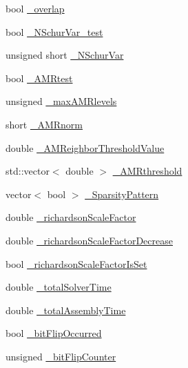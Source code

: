 \begin{DoxyCompactItemize}
bool \mbox{\hyperlink{classfemus_1_1_linear_implicit_system_af23defcf6c2eba0562a84d7962549497}{\+\_\+overlap}}
\item 
bool \mbox{\hyperlink{classfemus_1_1_linear_implicit_system_a30b608669fe5a231dbadf1f04bdbcd0b}{\+\_\+\+N\+Schur\+Var\+\_\+test}}
\item 
unsigned short \mbox{\hyperlink{classfemus_1_1_linear_implicit_system_aca9a90ea67a09df882aac0deb9979ac4}{\+\_\+\+N\+Schur\+Var}}
\item 
bool \mbox{\hyperlink{classfemus_1_1_linear_implicit_system_ad9a08bfe2edb1797bb3dc3610f6687df}{\+\_\+\+A\+M\+Rtest}}
\item 
unsigned \mbox{\hyperlink{classfemus_1_1_linear_implicit_system_a635ed57cf2b36eca0cd709b6cf3bb05e}{\+\_\+max\+A\+M\+Rlevels}}
\item 
short \mbox{\hyperlink{classfemus_1_1_linear_implicit_system_a78bbfb1cd17993efda3e259ba237e61f}{\+\_\+\+A\+M\+Rnorm}}
\item 
double \mbox{\hyperlink{classfemus_1_1_linear_implicit_system_ae5d3bb29bdbc5b5b17b3f8dff042c95c}{\+\_\+\+A\+M\+Reighbor\+Threshold\+Value}}
\item 
std\+::vector$<$ double $>$ \mbox{\hyperlink{classfemus_1_1_linear_implicit_system_abd5596868b55806935472a1df3ea1da9}{\+\_\+\+A\+M\+Rthreshold}}
\item 
vector$<$ bool $>$ \mbox{\hyperlink{classfemus_1_1_linear_implicit_system_af67cc57d6d8d173e9340d1eb7398d7da}{\+\_\+\+Sparsity\+Pattern}}
\item 
double \mbox{\hyperlink{classfemus_1_1_linear_implicit_system_a9c6de306e5972eed8d54f26b306c82b3}{\+\_\+richardson\+Scale\+Factor}}
\item 
double \mbox{\hyperlink{classfemus_1_1_linear_implicit_system_af3fd4142ab05d8c04c197b0f4c384129}{\+\_\+richardson\+Scale\+Factor\+Decrease}}
\item 
bool \mbox{\hyperlink{classfemus_1_1_linear_implicit_system_a74deb5452522f42d62659b5f51bcd411}{\+\_\+richardson\+Scale\+Factor\+Is\+Set}}
\item 
double \mbox{\hyperlink{classfemus_1_1_linear_implicit_system_a9bde2059b1e8388817dbe9bb678e2df4}{\+\_\+total\+Solver\+Time}}
\item 
double \mbox{\hyperlink{classfemus_1_1_linear_implicit_system_a4a2a09a05aec46b9ae0d63a6ab47641f}{\+\_\+total\+Assembly\+Time}}
\item 
bool \mbox{\hyperlink{classfemus_1_1_linear_implicit_system_a501584788d9e4ee9279e13021d0a9a78}{\+\_\+bit\+Flip\+Occurred}}
\item 
unsigned \mbox{\hyperlink{classfemus_1_1_linear_implicit_system_a4c01614bd8351ad30956a86019972576}{\+\_\+bit\+Flip\+Counter}}
\end{DoxyCompactItemize}
